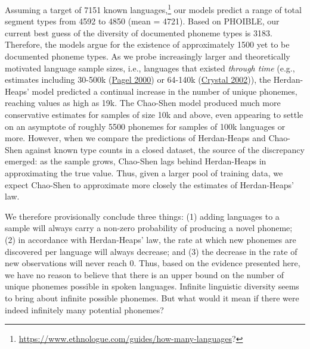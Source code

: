 \documentclass[
]{article}
\begin{document}
Assuming a target of 7151 known languages,\footnote{\url{https://www.ethnologue.com/guides/how-many-languages}?}
our models predict a range of total segment types from 4592 to 4850
(mean = 4721). Based on PHOIBLE, our current best guess of the diversity
of documented phoneme types is 3183. Therefore, the models argue for the
existence of approximately 1500 yet to be documented phoneme types. As
we probe increasingly larger and theoretically motivated language sample
sizes, i.e., languages that existed \emph{through time} (e.g., estimates
including 30-500k (\protect\hyperlink{ref-Pagel2000}{Pagel 2000}) or
64-140k (\protect\hyperlink{ref-Crystal2002}{Crystal 2002})), the
Herdan-Heaps' model predicted a continual increase in the number of
unique phonemes, reaching values as high as 19k. The Chao-Shen model
produced much more conservative estimates for samples of size 10k and
above, even appearing to settle on an asymptote of roughly 5500 phonemes
for samples of 100k languages or more. However, when we compare the
predictions of Herdan-Heaps and Chao-Shen against known type counts in a
closed dataset, the source of the discrepancy emerged: as the sample
grows, Chao-Shen lags behind Herdan-Heaps in approximating the true
value. Thus, given a larger pool of training data, we expect Chao-Shen
to approximate more closely the estimates of Herdan-Heaps' law.

We therefore provisionally conclude three things: (1) adding languages
to a sample will always carry a non-zero probability of producing a
novel phoneme; (2) in accordance with Herdan-Heaps' law, the rate at
which new phonemes are discovered per language will always decrease; and
(3) the decrease in the rate of new observations will never reach 0.
Thus, based on the evidence presented here, we have no reason to believe
that there is an upper bound on the number of unique phonemes possible
in spoken languages. Infinite linguistic diversity seems to bring about
infinite possible phonemes. But what would it mean if there were indeed
infinitely many potential phonemes?
\end{document}
